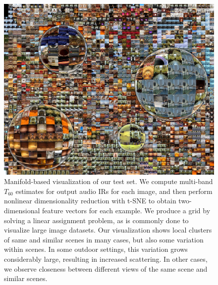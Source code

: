 \begin{figure}
    \centering
    \includegraphics[width=\textwidth]{dataset_tsne2.png}
    \caption{Manifold-based visualization of our test set. We compute multi-band $T_{60}$ estimates for output audio IRs for each image, and then perform nonlinear dimensionality reduction with t-SNE to obtain two-dimensional feature vectors for each example. We produce a grid by solving a linear assignment problem, as is commonly done to visualize large image datasets. Our visualization shows local clusters of same and similar scenes in many cases, but also some variation within scenes. In some outdoor settings, this variation grows considerably large, resulting in increased scattering. In other cases, we observe closeness between different views of the same scene and similar scenes.}
    \label{fig:tsne}
\end{figure}